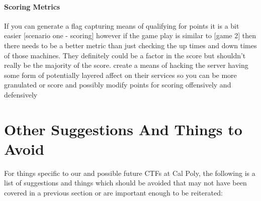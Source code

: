 \documentclass[10pt]{article}
\begin{document}
\paragraph{Scoring Metrics}
If you can generate a flag capturing means of qualifying for points it is a bit easier
[scenario one - scoring] however if the game play is similar to [game 2] then there
needs to be a better metric than just checking the up times and down times of those machines.
They definitely could be a factor in the score but shouldn't really be the majority of the score.
create a means of hacking the server having some form of potentially layered affect on their
services so you can be more granulated or score and possibly modify points for scoring
offensively and defensively

\section{Other Suggestions And Things to Avoid}
For things specific to our and possible future CTFs at Cal Poly, the following
is a list of suggestions and things which should be avoided that may not have
been covered in a previous section or are important enough to be reiterated:
\end{document}
